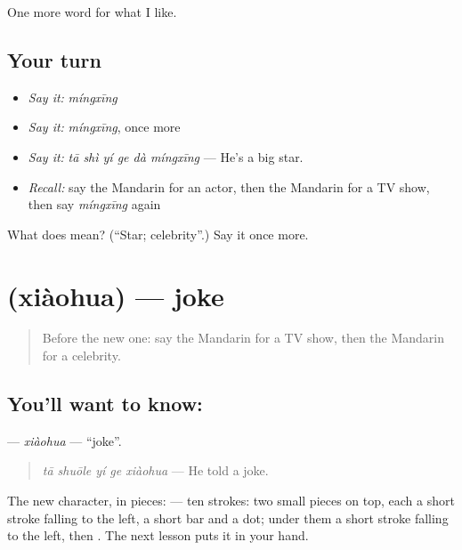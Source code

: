 \begin{grammarlens}[title={What you've built}]
One more word for what I like.
\end{grammarlens}

\subsection*{Your turn}
\begin{itemize}
\raggedright
  \item \emph{Say it:} \emph{míngxīng}
  \item \emph{Say it:} \emph{míngxīng}, once more
  \item \emph{Say it:} \emph{tā shì yí ge dà míngxīng} — He's a big star.
  \item \emph{Recall:} say the Mandarin for an actor, then the Mandarin for a TV show, then say \emph{míngxīng} again
\end{itemize}

\begin{tcolorbox}[breakable,colback=teal!4,colframe=teal!35!black,title={Before you move on}]
What does  mean? (\textquotedblleft{}Star; celebrity\textquotedblright{}.) Say it once more.
\end{tcolorbox}
\section[\texorpdfstring{\zh{笑话} (xiàohua)}{笑话 (xiàohua)}]{ (xiàohua) — joke}

\label{lesson:ZH-C267-xiaohua}



\begin{quote}
Before the new one: say the Mandarin for a TV show, then the Mandarin for a celebrity.
\end{quote}

\subsection*{You'll want to know: }
\textbf{} — \emph{xiàohua} — \textquotedblleft{}joke\textquotedblright{}.

\begin{quote}
\textbf{} \emph{tā shuōle yí ge xiàohua} — He told a joke.
\end{quote}

The new character, in pieces:  — ten strokes: two small pieces on top, each a short stroke falling to the left, a short bar and a dot; under them a short stroke falling to the left, then . The next lesson puts it in your hand.

